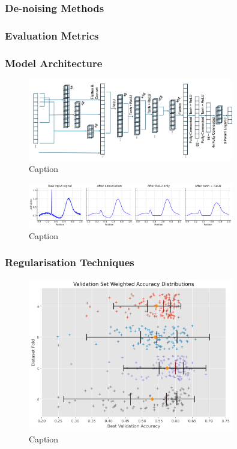 \subsubsection{De-noising Methods}
\subsubsection{Evaluation Metrics}

\subsubsection{Model Architecture}
\begin{figure}[htbp]
  \centering
  \includegraphics[width=0.8\textwidth]{Images/SCNN_TPL_Arch.png}
  \caption{Caption}
  \label{fig:my-label}
\end{figure}

\begin{figure}[htbp]
  \centering
  \includegraphics[width=0.8\textwidth]{Images/Tanh_Relu_Demo.png}
  \caption{Caption}
  \label{fig:my-label}
\end{figure}
\subsubsection{Regularisation Techniques}

\begin{figure}[htbp] 
    \centering 
    \includegraphics[width=0.8\textwidth]{Images/best_val_accuracy.png} 
    \caption{Caption} \label{fig:my-label}
\end{figure}

